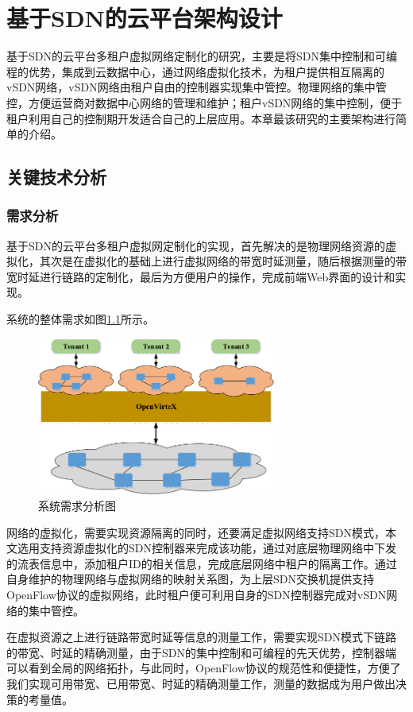 \chapter{基于SDN的云平台架构设计}
基于SDN的云平台多租户虚拟网络定制化的研究，主要是将SDN集中控制和可编程的优势，集成到云数据中心，通过网络虚拟化技术，为租户提供相互隔离的vSDN网络，vSDN网络由租户自由的控制器实现集中管控。物理网络的集中管控，方便运营商对数据中心网络的管理和维护；租户vSDN网络的集中控制，便于租户利用自己的控制期开发适合自己的上层应用。本章最该研究的主要架构进行简单的介绍。
\section{关键技术分析}
\subsection{需求分析}
基于SDN的云平台多租户虚拟网定制化的实现，首先解决的是物理网络资源的虚拟化，其次是在虚拟化的基础上进行虚拟网络的带宽时延测量，随后根据测量的带宽时延进行链路的定制化，最后为方便用户的操作，完成前端Web界面的设计和实现。

系统的整体需求如图\ref{fig:demand}所示。

\begin{figure}[!htb]
  \centering
  \includegraphics[width=0.7\textwidth]{logo/ovx.png}
  \caption{系统需求分析图}
  \label{fig:demand}
\end{figure}

网络的虚拟化，需要实现资源隔离的同时，还要满足虚拟网络支持SDN模式，本文选用支持资源虚拟化的SDN控制器来完成该功能，通过对底层物理网络中下发的流表信息中，添加租户ID的相关信息，完成底层网络中租户的隔离工作。通过自身维护的物理网络与虚拟网络的映射关系图，为上层SDN交换机提供支持OpenFlow协议的虚拟网络，此时租户便可利用自身的SDN控制器完成对vSDN网络的集中管控。

在虚拟资源之上进行链路带宽时延等信息的测量工作，需要实现SDN模式下链路的带宽、时延的精确测量，由于SDN的集中控制和可编程的先天优势，控制器端可以看到全局的网络拓扑，与此同时，OpenFlow协议的规范性和便捷性，方便了我们实现可用带宽、已用带宽、时延的精确测量工作，测量的数据成为用户做出决策的考量值。

